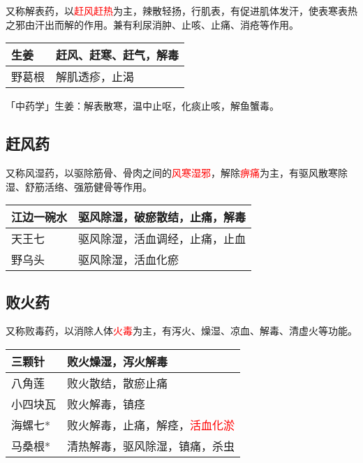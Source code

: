\documentclass[cn,blue,12pt,normal,founder]{elegantnote}
\newcommand{\redt}[1]{\textcolor{red}{{}#1}}      %
\begin{document}
又称解表药，以\redt{赶风赶热}为主，辣散轻扬，行肌表，有促进肌体发汗，使表寒表热之邪由汗出而解的作用。兼有利尿消肿、止咳、止痛、消疮等作用。

\begin{table}[H]
  \begin{tabular}{|l|l|}
  \hline
  生姜 & 赶风、赶寒、赶气，解毒 \\ \hline
  野葛根 & 解肌透疹，止渴     \\ \hline
  \end{tabular}
\end{table}

\begin{note}
  「中药学」生姜：解表散寒，温中止呕，化痰止咳，解鱼蟹毒。
\end{note}

\subsection{赶风药}

又称风湿药，以驱除筋骨、骨肉之间的\redt{风寒湿邪}，解除\redt{痹痛}为主，有驱风散寒除湿、舒筋活络、强筋健骨等作用。

\begin{table}[H]
  \begin{tabular}{|l|l|}
  \hline
  江边一碗水  & 驱风除湿，破瘀散结，止痛，解毒 \\ \hline
  天王七     & 驱风除湿，活血调经，止痛，止血     \\ \hline
  野乌头     & 驱风除湿，活血化瘀               \\ \hline
  \end{tabular}
\end{table}

\subsection{败火药}

又称败毒药，以消除人体\redt{火毒}为主，有泻火、燥湿、凉血、解毒、清虚火等功能。

\begin{table}[H]
  \begin{tabular}{|l|l|}
  \hline
  三颗针    & 败火燥湿，泻火解毒     \\ \hline
  八角莲    & 败火散结，散瘀止痛     \\ \hline
  小四块瓦  & 败火解毒，镇痉         \\ \hline
  海螺七*    & 败火解毒，止痛，解痉，\redt{活血化淤}    \\ \hline
  马桑根*    & 清热解毒，驱风除湿，镇痛，杀虫   \\ \hline
  \end{tabular}
\end{table}
\end{document}
